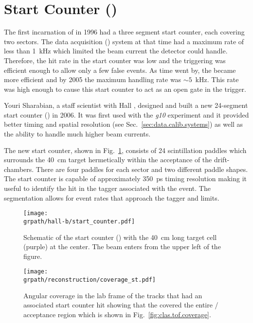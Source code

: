 \section{\label{sec:clas.st}Start Counter ()}

The first incarnation of  in 1996 had a three segment start counter, each covering two sectors. The data acquisition () system at that time had a maximum rate of less than 1~kHz which limited the beam current the detector could handle. Therefore, the hit rate in the start counter was low and the triggering was efficient enough to allow only a few false events. As time went by, the  became more efficient and by 2005 the maximum handling rate was $\sim5$~kHz. This rate was high enough to cause this start counter to act as an open gate in the trigger.

Youri Sharabian, a  staff scientist with Hall , designed and built a new 24-segment start counter\cite{clas.st} () in 2006. It was first used with the \emph{g10} experiment\cite{clas.thesis.mckinnon} and it provided better timing and spatial resolution (see Sec.~\ref{sec:data.calib.systems}) as well as the ability to handle much higher beam currents.

The new start counter, shown in Fig.~\ref{fig:clas.st}, consists of 24 scintillation paddles which surrounds the 40~cm target hermetically within the acceptance of the drift-chambers. There are four paddles for each sector and two different paddle shapes. The start counter is capable of approximately 350~ps timing resolution making it useful to identify the hit in the tagger associated with the event. The segmentation allows for event rates that approach the tagger and  limits.

\begin{figure}\begin{center}
\texttt{[image: \\grpath/hall-b/start\_counter.pdf]}
\caption[Start Counter Schematic]{\label{fig:clas.st}{}Schematic of the start counter () with the 40~cm long target cell (purple) at the center. The beam enters from the upper left of the figure.}
\end{center}\end{figure}

\begin{figure}\begin{center}
\texttt{[image: \\grpath/reconstruction/coverage\_st.pdf]}
\caption[Start Counter Angular Coverage]{\label{fig:clas.st.coverage}{}Angular coverage in the lab frame of the tracks that had an associated start counter hit showing that the  covered the entire / acceptance region which is shown in Fig.~\ref{fig:clas.tof.coverage}.}
\end{center}\end{figure}




